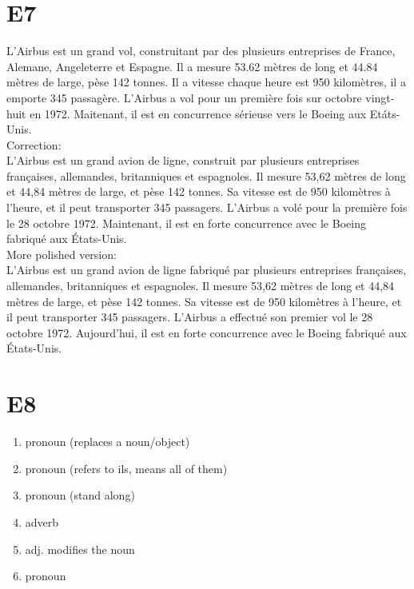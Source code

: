 \documentclass{book}
\begin{document}
    \section{E7}
        L'Airbus est un grand vol, construitant par des plusieurs entreprises de France, Alemane, Angeleterre et Espagne.
        Il a mesure 53.62 mètres de long et 44.84 mètres de large, pèse 142 tonnes. 
        Il a vitesse chaque heure est 950 kilomètres, il a emporte 345 passagère.
        L'Airbus a vol pour un première fois sur octobre vingt-huit en 1972. 
        Maitenant, il est en concurrence sérieuse vers le Boeing aux Etáts-Unis. 
        \\
        Correction:
        \\
        L'Airbus est un grand avion de ligne, construit par plusieurs entreprises françaises, allemandes, britanniques et espagnoles.
        Il mesure 53,62 mètres de long et 44,84 mètres de large, et pèse 142 tonnes.
        Sa vitesse est de 950 kilomètres à l'heure, et il peut transporter 345 passagers.
        L'Airbus a volé pour la première fois le 28 octobre 1972.
        Maintenant, il est en forte concurrence avec le Boeing fabriqué aux États-Unis.
        \\
        More polished version:
        \\
        L'Airbus est un grand avion de ligne fabriqué par plusieurs entreprises françaises, allemandes, britanniques et espagnoles. 
        Il mesure 53,62 mètres de long et 44,84 mètres de large, et pèse 142 tonnes. 
        Sa vitesse est de 950 kilomètres à l'heure, et il peut transporter 345 passagers. 
        L'Airbus a effectué son premier vol le 28 octobre 1972. 
        Aujourd'hui, il est en forte concurrence avec le Boeing fabriqué aux États-Unis.

    \section{E8}
        \begin{enumerate}
            \item pronoun (replaces a noun/object)
            \item pronoun (refers to ils, means all of them)
            \item pronoun (stand along)
            \item adverb
            \item adj. modifies the noun
            \item pronoun
        \end{enumerate}
\end{document}
